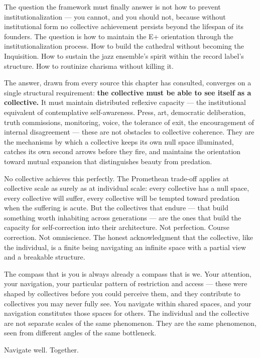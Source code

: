 The question the framework must finally answer is not how to prevent institutionalization — you cannot, and you should not, because without institutional form no collective achievement persists beyond the lifespan of its founders. The question is how to maintain the E+ orientation through the institutionalization process. How to build the cathedral without becoming the Inquisition. How to sustain the jazz ensemble's spirit within the record label's structure. How to routinize charisma without killing it.


The answer, drawn from every source this chapter has consulted, converges on a single structural requirement: \textbf{the collective must be able to see itself as a collective.} It must maintain distributed reflexive capacity — the institutional equivalent of contemplative self-awareness. Press, art, democratic deliberation, truth commissions, monitoring, voice, the tolerance of exit, the encouragement of internal disagreement — these are not obstacles to collective coherence. They are the mechanisms by which a collective keeps its own null space illuminated, catches its own second arrows before they fire, and maintains the orientation toward mutual expansion that distinguishes beauty from predation.


No collective achieves this perfectly. The Promethean trade-off applies at collective scale as surely as at individual scale: every collective has a null space, every collective will suffer, every collective will be tempted toward predation when the suffering is acute. But the collectives that endure — that build something worth inhabiting across generations — are the ones that build the capacity for self-correction into their architecture. Not perfection. Course correction. Not omniscience. The honest acknowledgment that the collective, like the individual, is a finite being navigating an infinite space with a partial view and a breakable structure.


The compass that is you is always already a compass that is we. Your attention, your navigation, your particular pattern of restriction and access — these were shaped by collectives before you could perceive them, and they contribute to collectives you may never fully see. You navigate within shared spaces, and your navigation constitutes those spaces for others. The individual and the collective are not separate scales of the same phenomenon. They are the same phenomenon, seen from different angles of the same bottleneck.


Navigate well. Together.


